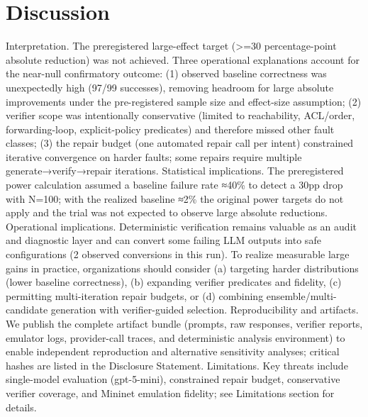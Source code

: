 \documentclass[conference]{IEEEtran}
\begin{document}
\section{Discussion}
Interpretation. The preregistered large-effect target (>=30 percentage-point absolute reduction) was not achieved. Three operational explanations account for the near-null confirmatory outcome: (1) observed baseline correctness was unexpectedly high (97/99 successes), removing headroom for large absolute improvements under the pre-registered sample size and effect-size assumption; (2) verifier scope was intentionally conservative (limited to reachability, ACL/order, forwarding-loop, explicit-policy predicates) and therefore missed other fault classes; (3) the repair budget (one automated repair call per intent) constrained iterative convergence on harder faults; some repairs require multiple generate→verify→repair iterations. Statistical implications. The preregistered power calculation assumed a baseline failure rate ≈40\% to detect a 30pp drop with N=100; with the realized baseline ≈2\% the original power targets do not apply and the trial was not expected to observe large absolute reductions. Operational implications. Deterministic verification remains valuable as an audit and diagnostic layer and can convert some failing LLM outputs into safe configurations (2 observed conversions in this run). To realize measurable large gains in practice, organizations should consider (a) targeting harder distributions (lower baseline correctness), (b) expanding verifier predicates and fidelity, (c) permitting multi-iteration repair budgets, or (d) combining ensemble/multi-candidate generation with verifier-guided selection. Reproducibility and artifacts. We publish the complete artifact bundle (prompts, raw responses, verifier reports, emulator logs, provider-call traces, and deterministic analysis environment) to enable independent reproduction and alternative sensitivity analyses; critical hashes are listed in the Disclosure Statement. Limitations. Key threats include single-model evaluation (gpt-5-mini), constrained repair budget, conservative verifier coverage, and Mininet emulation fidelity; see Limitations section for details.
\end{document}
